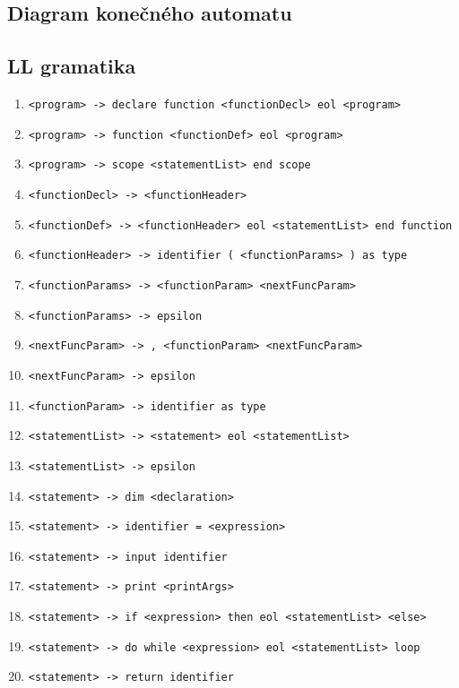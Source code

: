 \documentclass{article}
\begin{document}
        \subsection{Diagram konečného automatu}
            \newpage
            
        \subsection{LL gramatika}
            \begin{enumerate}
                \item \texttt{<program> -> declare function <functionDecl> eol <program>}
                \item \texttt{<program> -> function <functionDef> eol <program>}
                \item \texttt{<program> -> scope <statementList> end scope}
                
                \item \texttt{<functionDecl> -> <functionHeader>}
                \item \texttt{<functionDef> -> <functionHeader> eol <statementList> end function}
                
                \item \texttt{<functionHeader> -> identifier ( <functionParams> ) as type}
                
                \item \texttt{<functionParams> -> <functionParam> <nextFuncParam>}
                \item \texttt{<functionParams> -> epsilon}
                
                \item \texttt{<nextFuncParam> -> , <functionParam> <nextFuncParam>}
                \item \texttt{<nextFuncParam> -> epsilon}
                
                \item \texttt{<functionParam> -> identifier as type}
                
                \item \texttt{<statementList> -> <statement> eol <statementList>}
                \item \texttt{<statementList> -> epsilon}
                
                \item \texttt{<statement> -> dim <declaration>}
                \item \texttt{<statement> -> identifier = <expression>}
                \item \texttt{<statement> -> input identifier}
                \item \texttt{<statement> -> print <printArgs>}
                \item \texttt{<statement> -> if <expression> then eol <statementList> <else>}
                \item \texttt{<statement> -> do while <expression> eol <statementList> loop}
                \item \texttt{<statement> -> return identifier}
                

\end{enumerate}
\end{document}
